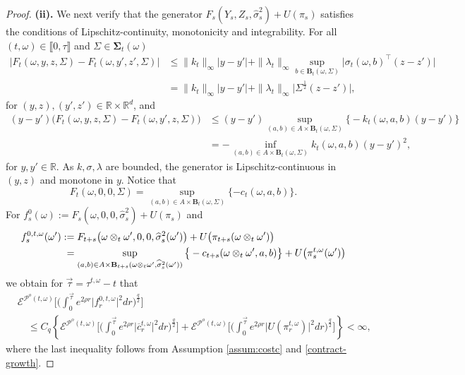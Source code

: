 \documentclass[11pt,a4paper]{article}
\numberwithin{equation}{section}
\def\dbR{\mathbb{R}}
\newcommand{\cE}{\mathcal{E}}
\newcommand{\cP}{\mathcal{P}}
\theoremstyle{definition}
\begin{document}
\begin{proof}
  \noindent \textbf{(ii).} We next verify that the generator $F_s(Y_s,Z_s,\widehat{\sigma}^2_s) + U(\pi_s)$ satisfies the conditions of Lipschitz-continuity, monotonicity and integrability. 
    For all $(t,\omega)\in\llbracket 0,\tau\rrbracket$ and $\Sigma\in\mathbf{\Sigma}_t(\omega)$
      \begin{align*}
        |F_t(\omega,y,z,\Sigma)-F_t(\omega,y',z',\Sigma)| &\leq \|k_t\|_\infty|y-y'| + \|\lambda_t\|_{\infty}\sup_{b\in\mathbf{B}_t(\omega,\Sigma)}\big|\sigma_t(\omega,b)^\top(z-z')\big|  \\
            &= \|k_t\|_\infty|y-y'| + \|\lambda_t\|_{\infty}\big|\Sigma^\frac{1}{2}(z-z')\big|,
      \end{align*}  
      for $(y,z),(y',z')\in\dbR\times\dbR^d$, and 
      \begin{align*}
        (y-y')\big(F_t(\omega,y,z,\Sigma)-F_t(\omega,y',z,\Sigma)\big) &\leq (y-y')\sup_{(a,b)\in A\times\mathbf{B}_t(\omega,\Sigma)}\big\{-k_t(\omega,a,b)(y-y')\big\} \\
                          & = -\inf_{(a,b)\in A\times\mathbf{B}_t(\omega,\Sigma)}k_t(\omega,a,b)(y-y')^2, 
      \end{align*}
      for $y,y'\in\dbR$. 
    As $k,\sigma,\lambda$ are bounded, the generator is Lipschitz-continuous in $(y,z)$ and monotone in $y$. 
    Notice that
      $$ F_t(\omega,0,0,\Sigma) = \sup_{(a,b)\in A\times\mathbf{B}_t(\omega,\Sigma)}\{-c_t(\omega,a,b)\}. $$
    For $f^0_s(\omega):=F_s(\omega,0,0,\widehat{\sigma}_s^2)+U(\pi_s)$ and 
      \begin{align*}
         f^{0,t,\omega}_s(\omega') &:= F_{t+s}\big(\omega\otimes_t\omega',0,0,\widehat{\sigma}_s^2(\omega')\big)+U\big(\pi_{t+s}(\omega\otimes_t\omega')\big)  \\
                         &\hspace{1mm} = \sup_{(a,b)\in A\times\mathbf{B}_{t+s}(\omega\otimes_t\omega',\widehat{\sigma}^2_s(\omega'))}\big\{-c_{t+s}(\omega\otimes_t\omega',a,b)\big\} + U\big(\pi^{t,\omega}_{s}(\omega')\big)
      \end{align*}
      we obtain for $\vec{\tau}=\tau^{t,\omega}-t$ that
      \begin{align*}
        & \cE^{\cP^o(t,\omega)}\bigg[\bigg(\int_0^{\vec{\tau}} e^{2\rho r}\big|f^{0,t,\omega}_r\big|^2dr\bigg)^{\frac{q}{2}}\bigg] \\
        & \quad \leq C_q \left\{\cE^{\cP^o(t,\omega)}\bigg[\bigg(\int_0^{\vec{\tau}} e^{2\rho r}\big|\overline{c}^{t,\omega}_r\big|^2dr\bigg)^{\frac{q}{2}}\bigg] 
                              + \cE^{\cP^o(t,\omega)}\bigg[\bigg(\int_0^{\vec{\tau}} e^{2\rho r}\big|U(\pi_r^{t,\omega})\big|^2dr\bigg)^{\frac{q}{2}}\bigg]\right\} <\infty, 
      \end{align*}
      where the last inequality follows from Assumption \ref{assum:costc} and \eqref{contract-growth}.
    

\end{proof}
\end{document}
